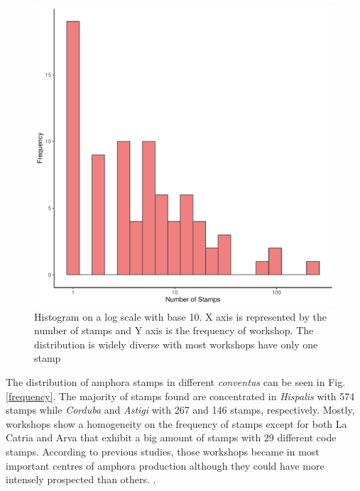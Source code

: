 \documentclass[review]{elsarticle}
\newcommand{\memo}[2]{\textcolor{#1}{#2}}
\newcommand{\xavi}[1]{\memo{magenta}{XRC: #1\\}}
\begin{document}
\begin{figure}[htp]
	\centering
\includegraphics[width=\linewidth]{figs/frequencystamp.pdf}
\caption{Histogram on a log scale with base 10. X axis is represented by the number of stamps and Y axis is the frequency of workshop. The distribution is widely diverse with most workshops have only one stamp}
\label{stamps}
\end{figure} 



The distribution of amphora stamps in different \textit{conventus} can be seen in Fig. \ref{frequency}. The majority of stamps found are concentrated in \textit{Hispalis} with 574 stamps while \textit{Corduba} and \textit{Astigi} with 267 and 146 stamps, respectively. Mostly, workshops show a homogeneity on the frequency of stamps except for both La Catria and Arva that exhibit a big amount of stamps with 29 different code stamps. According to previous studies, those workshops became in most important centres of amphora production although they could have more intensely prospected than others. \citep{arva_1997}.
 
\end{document}
